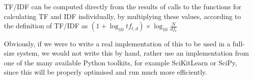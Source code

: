 \documentclass{article}
\begin{document}

TF/IDF can be computed directly from the results of calls to the functions for calculating TF and IDF individually, by multiplying these values, according to the definition of TF/IDF as $(1+ \log_10 tf_{t,d})\times \log_10 \frac{N}{df_t}$



Obviously, if we were to write a real implementation of this to be used in a full-size system, we would not write this by hand, rather use an implementation from one of the many available Python toolkits, for example SciKitLearn or SciPy, since this will be properly optimised and run much more efficiently. 
\end{document}
